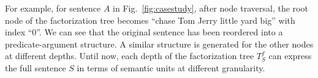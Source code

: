 For example, for sentence $A$ in Fig.~\ref{fig:casestudy}, after node traversal, the root node of the factorization tree becomes ``chase Tom Jerry little yard big'' with index ``0''. We can see that the original sentence has been reordered into a predicate-argument structure. A similar structure is generated for the other nodes at different depths. 
Until now, each depth of the factorization tree $T^f_S$ can express the full sentence $S$  in terms of  semantic units at different granularity.



